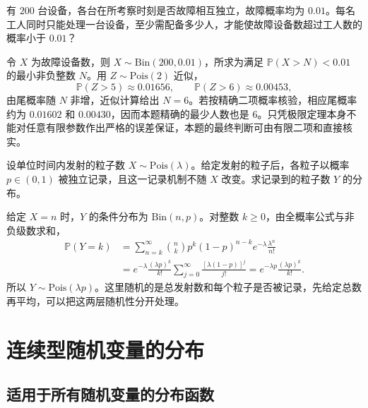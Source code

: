 \begin{example}
\label{ex:study-poisson-repair}
有 $200$ 台设备，各台在所考察时刻是否故障相互独立，故障概率均为 $0.01$。每名工人同时只能处理一台设备，至少需配备多少人，才能使故障设备数超过工人数的概率小于 $0.01$？
\end{example}

\begin{solve}
令 $X$ 为故障设备数，则 $X\sim\mathrm{Bin}(200,0.01)$，所求为满足 $\mathbb P(X>N)<0.01$ 的最小非负整数 $N$。用 $Z\sim\mathrm{Pois}(2)$ 近似，
\[
  \mathbb P(Z>5)\approx0.01656,\qquad
  \mathbb P(Z>6)\approx0.00453,
\]
由尾概率随 $N$ 非增，近似计算给出 $N=6$。若按精确二项概率核验，相应尾概率约为 $0.01602$ 和 $0.00430$，因而本题精确的最少人数也是 $6$。只凭极限定理本身不能对任意有限参数作出严格的误差保证，本题的最终判断可由有限二项和直接核实。
\end{solve}

\begin{example}
\label{ex:study-poisson-thinning}
设单位时间内发射的粒子数 $X\sim\mathrm{Pois}(\lambda)$。给定发射的粒子后，各粒子以概率 $p\in(0,1)$ 被独立记录，且这一记录机制不随 $X$ 改变。求记录到的粒子数 $Y$ 的分布。
\end{example}

\begin{solve}
给定 $X=n$ 时，$Y$ 的条件分布为 $\mathrm{Bin}(n,p)$。对整数 $k\ge0$，由全概率公式与非负级数求和，
\begin{align*}
  \mathbb P(Y=k)
  &=\sum_{n=k}^{\infty}\binom nk p^k(1-p)^{n-k}
       e^{-\lambda}\frac{\lambda^n}{n!}\\
  &=e^{-\lambda}\frac{(\lambda p)^k}{k!}
       \sum_{j=0}^{\infty}\frac{[\lambda(1-p)]^j}{j!}
    =e^{-\lambda p}\frac{(\lambda p)^k}{k!}.
\end{align*}
所以 $Y\sim\mathrm{Pois}(\lambda p)$。这里随机的是总发射数和每个粒子是否被记录，先给定总数再平均，可以把这两层随机性分开处理。
\end{solve}

\section{连续型随机变量的分布}
\label{sec:study-continuous-distributions}

\subsection{适用于所有随机变量的分布函数}
\label{subsec:study-cdf}

